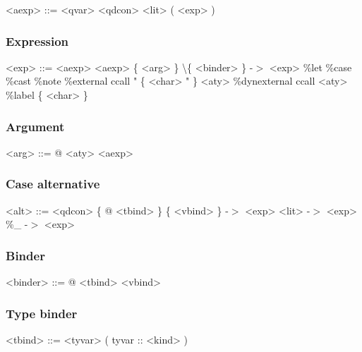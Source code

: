 \begin{grammar}
<aexp> ::= <qvar>
      \alt <qdcon>
      \alt <lit>
      \alt ( <exp> )
\end{grammar}

\subsubsection{Expression}

\begin{grammar}
<exp> ::= <aexp>
     \alt <aexp> \{ <arg> \}
     \alt \textbackslash \{ <binder> \} -$>$ <exp>
     \alt \%let 
     \alt \%case
     \alt \%cast
     \alt \%note
     \alt \%external ccall " \{ <char> " \} <aty>
     \alt \%dynexternal ccall <aty>
     \alt \%label \{ <char> \}
\end{grammar}

\subsubsection{Argument}

\begin{grammar}
<arg> ::= @ <aty>
     \alt <aexp>
\end{grammar}

\subsubsection{Case alternative}

\begin{grammar}
<alt> ::= <qdcon> \{ @ <tbind> \} \{ <vbind> \} -$>$ <exp>
     \alt <lit> -$>$ <exp>
     \alt \%\_ -$>$ <exp>
\end{grammar}

\subsubsection{Binder}

\begin{grammar}
<binder> ::= @ <tbind>
        \alt <vbind>
\end{grammar}

\subsubsection{Type binder}

\begin{grammar}
<tbind> ::= <tyvar>
       \alt ( tyvar :: <kind> )
\end{grammar}

